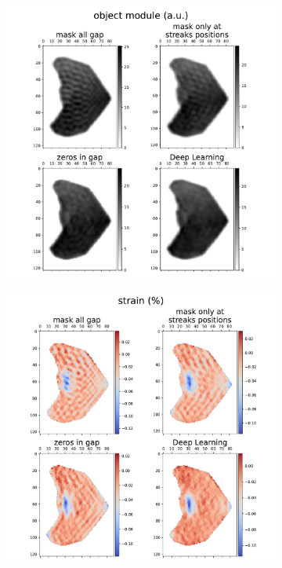 \begin{figure}[H]
    \centering
    \begin{subfigure}{0.47\textwidth} 
        \includegraphics[width=\linewidth]{figures/Inpainting/object_module_jerome.pdf}
        \caption*{}
    \end{subfigure}
    \hfill
    \begin{subfigure}{0.47\textwidth}
        \centering
        \includegraphics[width=\linewidth]{figures/Inpainting/object_strain_jerome.pdf}

\end{subfigure}
\end{figure}
